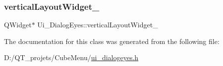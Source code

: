 \hypertarget{class_ui___dialog_eyes_a27186a39ae6dc855ac34f50e68590e54}{}\label{class_ui___dialog_eyes_a27186a39ae6dc855ac34f50e68590e54} 
\subsubsection{\texorpdfstring{vertical\+Layout\+Widget\+\_}{verticalLayoutWidget\_3}}
{\footnotesize\ttfamily Q\+Widget$\ast$ Ui\+\_\+\+Dialog\+Eyes\+::vertical\+Layout\+Widget\+\_}



The documentation for this class was generated from the following file\+:\begin{DoxyCompactItemize}
\item 
D\+:/\+Q\+T\+\_\+projets/\+Cube\+Menu/\hyperlink{ui__dialogeyes_8h}{ui\+\_\+dialogeyes.\+h}\end{DoxyCompactItemize}
